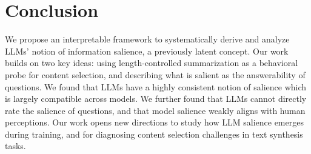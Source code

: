\section{Conclusion}
We propose an interpretable framework to systematically derive and analyze LLMs' notion of information salience, a previously latent concept.
Our work builds on two key ideas: using length-controlled summarization as a behavioral probe for content selection, and describing what is salient as the answerability of questions.
We found that LLMs have a highly consistent notion of salience which is largely compatible across models.
We further found that LLMs cannot directly rate the salience of questions, and that model salience weakly aligns with human perceptions.
Our work opens new directions to study how LLM salience emerges during training, and for diagnosing content selection challenges in text synthesis tasks.
